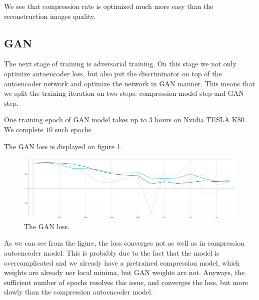 We see that compression rate is optimized much more easy than the reconstruction images quality.

\subsection{GAN}

The next stage of training is adversarial training. On this stage we not only optimize autoencoder loss, but also put the discriminator on top of the autoencoder network and optimize the network in GAN manner. This means that we split the training iteration on two steps: compression model step and GAN step.

One training epoch of GAN model takes up to $3$ hours on Nvidia TESLA K80. We complete $10$ such epochs.

The GAN loss is displayed on figure \ref{training-compression-gan-discriminator}.

\begin{figure}[!ht]
    \centering
    \includegraphics[width=\textwidth]{figure/compression-gan-discriminator.png}
    \caption{The GAN loss.}
    \label{training-compression-gan-discriminator}
\end{figure}

As we can see from the figure, the loss converges not as well as in compression autoencoder model. This is probably due to the fact that the model is overcomplicated and we already have a pretrained compression model, which weights are already ner local minima, but GAN weights are not. Anyways, the sufficient number of epochs resolves this issue, and converges the loss, but more slowly than the compression autoencoder model.

